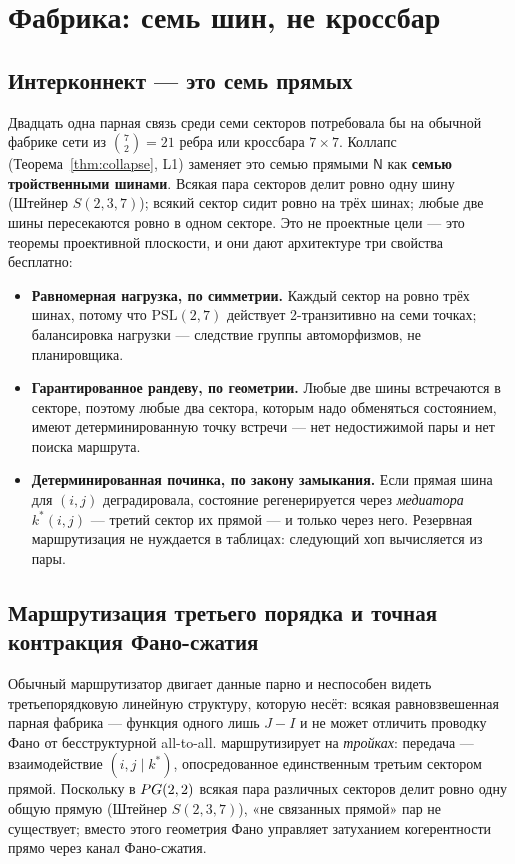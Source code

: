 \section{Фабрика: семь шин, не кроссбар}
\label{sec:fabric}

\subsection{Интерконнект --- это семь прямых}

Двадцать одна парная связь среди семи секторов потребовала бы на обычной
фабрике сети из $\binom{7}{2}=21$ ребра или кроссбара $7\times7$. Коллапс
(Теорема~\ref{thm:collapse}, L1) заменяет это семью прямыми $\mathsf{N}$ как
\textbf{семью тройственными шинами}. Всякая пара секторов делит ровно одну шину
(Штейнер $S(2,3,7)$); всякий сектор сидит ровно на трёх шинах; любые две шины
пересекаются ровно в одном секторе. Это не проектные цели --- это теоремы
проективной плоскости, и они дают архитектуре три свойства бесплатно:

\begin{itemize}[leftmargin=1.5em,itemsep=1pt]
  \item \textbf{Равномерная нагрузка, по симметрии.} Каждый сектор на ровно трёх
        шинах, потому что $\mathrm{PSL}(2,7)$ действует 2-транзитивно на семи
        точках; балансировка нагрузки --- следствие группы автоморфизмов, не
        планировщика.
  \item \textbf{Гарантированное рандеву, по геометрии.} Любые две шины
        встречаются в секторе, поэтому любые два сектора, которым надо обменяться
        состоянием, имеют детерминированную точку встречи --- нет недостижимой
        пары и нет поиска маршрута.
  \item \textbf{Детерминированная починка, по закону замыкания.} Если прямая
        шина для $(i,j)$ деградировала, состояние регенерируется через
        \emph{медиатора} $k^\ast(i,j)$ --- третий сектор их прямой --- и только
        через него. Резервная маршрутизация не нуждается в таблицах: следующий
        хоп вычисляется из пары.
\end{itemize}

\subsection{Маршрутизация третьего порядка и точная контракция Фано-сжатия}

Обычный маршрутизатор двигает данные парно и неспособен видеть третьепорядковую
линейную структуру, которую несёт: всякая равновзвешенная парная фабрика ---
функция одного лишь $J-I$ и не может отличить проводку Фано от бесструктурной
all-to-all. \TALOS{} маршрутизирует на \emph{тройках}: передача ---
взаимодействие $(i,j\mid k^\ast)$, опосредованное единственным третьим сектором
прямой. Поскольку в $PG(2,2)$ всякая пара различных секторов делит ровно одну
общую прямую (Штейнер $S(2,3,7)$), «не связанных прямой» пар не существует;
вместо этого геометрия Фано управляет затуханием когерентности прямо через
канал Фано-сжатия.

